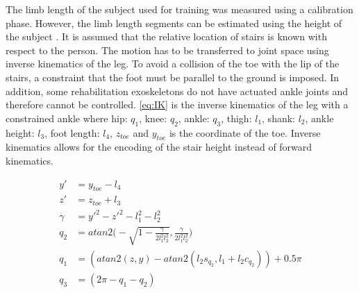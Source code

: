 The limb length of the subject used for training was measured using a calibration phase. However, the limb length segments can be estimated using the height of the subject \cite{anthropomorphic}. It is assumed that the relative location of stairs is known with respect to the person. The motion has to be transferred to joint space using inverse kinematics of the leg. To avoid a collision of the toe with the lip of the stairs, a constraint that the foot must be parallel to the ground is imposed. In addition, some rehabilitation exoskeletons do not have actuated ankle joints and therefore cannot be controlled.  \autoref{eq:IK} is the inverse kinematics of the leg with a constrained ankle where hip: $q_1$, knee: $q_2$, ankle: $q_3$, thigh: $l_1$, shank: $l_2$, ankle height: $l_3$, foot length: $l_4$, $z_{toe}$ and $y_{toe}$ is the coordinate of the toe. Inverse kinematics allows for the encoding of the stair height instead of forward kinematics. 

\begin{equation} 
    \begin{aligned} 
        y' &= y_{toe} - l_4 \\ 
        z' &= z_{toe} + l_3 \\  
        \gamma &= y'^2 - z'^2 - l_1^2  - l_2^2 \\ 
        q_2 &= atan2 \Bigg( -\sqrt{1 - \frac{\gamma }{2 l_1^2 l_2^2}}, \frac{\gamma}{2 l_1^2 l_2^2}\Bigg)\\ 
        q_1 &= (atan2(z, y) - atan2( l_2 s_{q_2}, l_1 + l_2 c_{q_2})) + 0.5\pi \\ 
        q_3 &= (2\pi - q_1 - q_2) 
    \end{aligned} 
    \label{eq:IK} 
\end{equation} 

